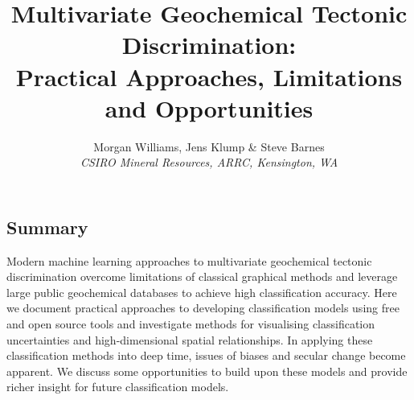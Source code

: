 \documentclass[a4,10pt]{article}
\date{}
\title{Multivariate Geochemical Tectonic Discrimination:\\Practical Approaches, Limitations and Opportunities}
\author{Morgan Williams, Jens Klump \& Steve Barnes\\\footnotesize{\textit{CSIRO Mineral Resources, ARRC, Kensington, WA}}}
\begin{document}
		
	\maketitle

	\subsection*{Summary}
	
	Modern machine learning approaches to multivariate geochemical tectonic discrimination overcome limitations of classical graphical methods and leverage large public geochemical databases to achieve high classification accuracy. Here we document practical approaches to developing classification models using free and open source tools and investigate methods for visualising classification uncertainties and high-dimensional spatial relationships. In applying these classification methods into deep time, issues of biases and secular change become apparent. We discuss some opportunities to build upon these models and provide richer insight for future classification models.
	
\end{document}
